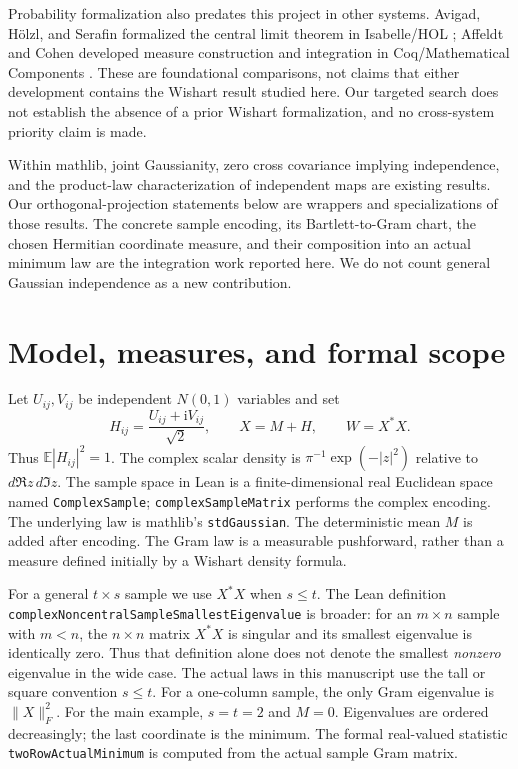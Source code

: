 \documentclass[11pt]{article}
\newcommand{\E}{\mathbb E}
\newcommand{\lean}[1]{{\small\nolinkurl{#1}}}
\begin{document}
Probability formalization also predates this project in other systems.
Avigad, H\"olzl, and Serafin formalized the central limit theorem in Isabelle/HOL
\cite{avigad}; Affeldt and Cohen developed measure construction and integration
in Coq/Mathematical Components \cite{affeldt}. These are foundational comparisons,
not claims that either development contains the Wishart result studied here.
Our targeted search does not establish the absence of a prior Wishart
formalization, and no cross-system priority claim is made.

Within mathlib, joint Gaussianity, zero cross covariance implying independence,
and the product-law characterization of independent maps are existing results.
Our orthogonal-projection statements below are wrappers and specializations
of those results. The concrete sample encoding, its Bartlett-to-Gram chart,
the chosen Hermitian coordinate measure, and their composition into an actual
minimum law are the integration work reported here. We do not count general
Gaussian independence as a new contribution.

\section{Model, measures, and formal scope}\label{sec:model}
Let $U_{ij},V_{ij}$ be independent $N(0,1)$ variables and set
\begin{equation}\label{eq:sample}
 H_{ij}=\frac{U_{ij}+\mathrm{i}V_{ij}}{\sqrt2},\qquad
 X=M+H,\qquad W=X^*X.
\end{equation}
Thus $\E|H_{ij}|^2=1$. The complex scalar density is
$\pi^{-1}\exp(-|z|^2)$ relative to $d\Re z\,d\Im z$.
The sample space in Lean is a finite-dimensional real Euclidean space named
\lean{ComplexSample}; \lean{complexSampleMatrix} performs the complex encoding.
The underlying law is mathlib's \lean{stdGaussian}. The deterministic mean
$M$ is added after encoding. The Gram law is a measurable pushforward, rather
than a measure defined initially by a Wishart density formula.

For a general $t\times s$ sample we use $X^*X$ when $s\leq t$.
The Lean definition \lean{complexNoncentralSampleSmallestEigenvalue} is broader:
for an $m\times n$ sample with $m<n$, the $n\times n$ matrix $X^*X$ is singular
and its smallest eigenvalue is identically zero. Thus that definition alone
does not denote the smallest \emph{nonzero} eigenvalue in the wide case.
The actual laws in this manuscript use the tall or square convention $s\leq t$.
For a one-column sample, the only Gram eigenvalue is $\|X\|_F^2$.
For the main example, $s=t=2$ and $M=0$. Eigenvalues are ordered decreasingly;
the last coordinate is the minimum. The formal real-valued statistic
\lean{twoRowActualMinimum} is computed from the actual sample Gram matrix.
\end{document}
